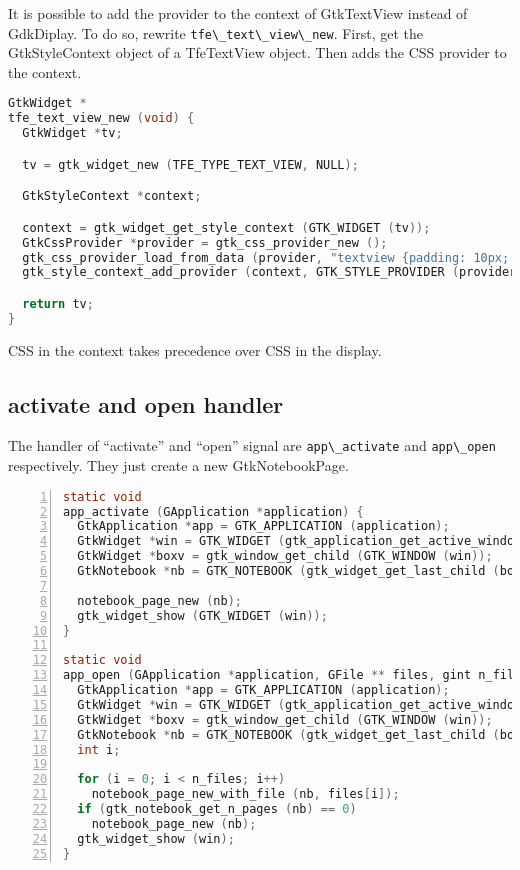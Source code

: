 It is possible to add the provider to the context of GtkTextView instead
of GdkDiplay. To do so, rewrite
\passthrough{\lstinline!tfe\_text\_view\_new!}. First, get the
GtkStyleContext object of a TfeTextView object. Then adds the CSS
provider to the context.

\begin{lstlisting}[language=C]
GtkWidget *
tfe_text_view_new (void) {
  GtkWidget *tv;

  tv = gtk_widget_new (TFE_TYPE_TEXT_VIEW, NULL);

  GtkStyleContext *context;

  context = gtk_widget_get_style_context (GTK_WIDGET (tv));
  GtkCssProvider *provider = gtk_css_provider_new ();
  gtk_css_provider_load_from_data (provider, "textview {padding: 10px; font-family: monospace; font-size: 12pt;}", -1);
  gtk_style_context_add_provider (context, GTK_STYLE_PROVIDER (provider), GTK_STYLE_PROVIDER_PRIORITY_USER);

  return tv;
}
\end{lstlisting}

CSS in the context takes precedence over CSS in the display.

\hypertarget{activate-and-open-handler}{%
\subsection{activate and open handler}\label{activate-and-open-handler}}

The handler of ``activate'' and ``open'' signal are
\passthrough{\lstinline!app\_activate!} and
\passthrough{\lstinline!app\_open!} respectively. They just create a new
GtkNotebookPage.

\begin{lstlisting}[language=C, numbers=left]
static void
app_activate (GApplication *application) {
  GtkApplication *app = GTK_APPLICATION (application);
  GtkWidget *win = GTK_WIDGET (gtk_application_get_active_window (app));
  GtkWidget *boxv = gtk_window_get_child (GTK_WINDOW (win));
  GtkNotebook *nb = GTK_NOTEBOOK (gtk_widget_get_last_child (boxv));

  notebook_page_new (nb);
  gtk_widget_show (GTK_WIDGET (win));
}

static void
app_open (GApplication *application, GFile ** files, gint n_files, const gchar *hint) {
  GtkApplication *app = GTK_APPLICATION (application);
  GtkWidget *win = GTK_WIDGET (gtk_application_get_active_window (app));
  GtkWidget *boxv = gtk_window_get_child (GTK_WINDOW (win));
  GtkNotebook *nb = GTK_NOTEBOOK (gtk_widget_get_last_child (boxv));
  int i;

  for (i = 0; i < n_files; i++)
    notebook_page_new_with_file (nb, files[i]);
  if (gtk_notebook_get_n_pages (nb) == 0)
    notebook_page_new (nb);
  gtk_widget_show (win);
}
\end{lstlisting}

